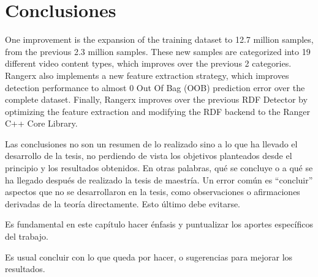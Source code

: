 \chapter{Conclusiones}
\label{chp:conclusions}

One improvement is the expansion of the training dataset to 12.7 million samples, from the previous 2.3 million samples. These new samples are categorized into 19 different video content types, which improves over the previous 2 categories. Rangerx also implements a new feature extraction strategy, which improves detection performance to almost 0 Out Of Bag (OOB) prediction error over the complete dataset. Finally, Rangerx improves over the previous RDF Detector by optimizing the feature extraction and modifying the RDF backend to the Ranger C++ Core Library.

Las conclusiones no son un resumen de lo realizado sino a lo que ha llevado el
desarrollo de la tesis, no perdiendo de vista los objetivos planteados desde
el principio y los resultados obtenidos.  En otras palabras, qué se concluye o
a qué se ha llegado después de realizado la tesis de maestría.  Un error
común es ``concluir'' aspectos que no se desarrollaron en la tesis, como
observaciones o afirmaciones derivadas de la teoría directamente.  Esto último
debe evitarse.

Es fundamental en este capítulo hacer énfasis y puntualizar los
aportes específicos del trabajo.

Es usual concluir con lo que queda por hacer, o sugerencias para mejorar los
resultados.

